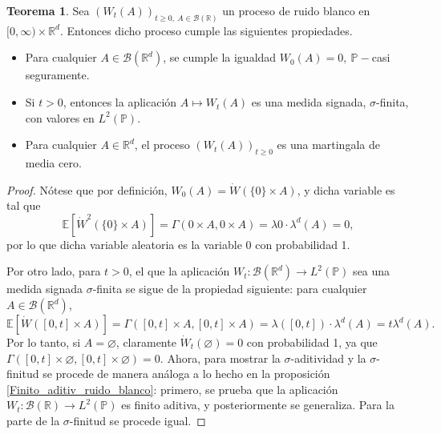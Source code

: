 \documentclass[letterpaper,twoside,12pt]{book}
\newcommand{\R}{\mathbb{R}}
\newcommand{\B}{\mathcal{B}}
\newcommand{\E}{\mathbb{E}}
\renewcommand{\P}{\mathbb{P}}
\newcommand{\W}{\dot{W}}
\newcommand{\1}{\mathds{1}}
\renewcommand{\to}{\rightarrow}
\theoremstyle{definition}
\theoremstyle{definition}
\newtheorem{teo}{Teorema}
\theoremstyle{remark}
\theoremstyle{definition}
\theoremstyle{definition}
\theoremstyle{definition}
\theoremstyle{definition}
\theoremstyle{definition}
\begin{document}
\begin{teo} 
Sea $(W_t(A))_{t\geq0, \ A\in \B(\R)}$ un proceso de ruido blanco en $[0,\infty)\times \R^{d}$. Entonces dicho proceso cumple las siguientes propiedades.
\begin{itemize}
   \item Para cualquier $A\in \B(\R^{d})$, se cumple la igualdad $W_0(A)=0, \ \P-$casi seguramente.
   \item Si $t>0$, entonces la aplicación $A\mapsto W_t(A)$ es una medida signada, $\sigma$-finita, con valores en $L^{2}(\P)$.
   \item Para cualquier $A\in \R^{d}$, el proceso $(W_t(A))_{t\geq0}$ es una martingala de media cero.
\end{itemize}
\end{teo}
\begin{proof} 
 Nótese que por definición, $W_0(A)=\W(\{0\}\times A)$, y dicha variable es tal que 
 \[
 \E\left[\W^2(\{0\}\times A)\right]=\Gamma(0\times A,0\times A)=\lambda{0}\cdot\lambda^{d}(A)=0,  
 \]
 por lo que dicha variable aleatoria es la variable 0 con probabilidad 1.

 Por otro lado, para $t>0$, el que la aplicación $W_t:\B(\R^{d})\to L^{2}(\P)$ sea una medida signada $\sigma$-finita se sigue de la propiedad siguiente: para cualquier $A\in \B(\R^{d})$, 
 \[
 \E\left[\W([0,t]\times A)\right]=\Gamma([0,t]\times A, [0,t]\times A)=\lambda([0,t])\cdot\lambda^{d}(A)=t\lambda^{d}(A). 
 \] 
 Por lo tanto, si $A=\varnothing$, claramente $\W_t(\varnothing)=0$ con probabilidad 1, ya que $\Gamma([0,t]\times\varnothing,[0,t]\times \varnothing)=0$. Ahora, para mostrar la $\sigma$-aditividad y la $\sigma$-finitud se procede de manera análoga a lo hecho en la proposición \ref{Finito_aditiv_ruido_blanco}: primero, se prueba que la aplicación $W_t:\B(\R)\to L^{2}(\P)$ es finito aditiva, y posteriormente se generaliza. Para la parte de la $\sigma$-finitud se procede igual.


\end{proof}
\end{document}
